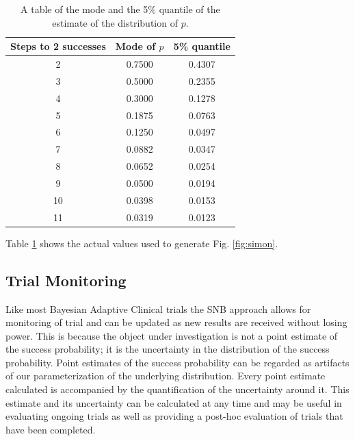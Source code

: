 \documentclass[12pt]{article}         %
\begin{document}
\begin{table}
\begin{center}
\begin{tabular}{|c|c|c|} \hline
{\bf Steps to 2 successes} & {\bf Mode of $p$} & {\bf 5\% quantile} \\ \hline
2 & 0.7500  & 0.4307 \\ \hline
3 & 0.5000  & 0.2355 \\ \hline
4 & 0.3000  & 0.1278 \\ \hline
5 & 0.1875  & 0.0763 \\ \hline
6 & 0.1250  & 0.0497 \\ \hline
7 & 0.0882  & 0.0347 \\ \hline
8 & 0.0652  & 0.0254 \\ \hline
9 & 0.0500  & 0.0194 \\ \hline
10 & 0.0398 & 0.0153 \\ \hline
11 & 0.0319 & 0.0123 \\ \hline
\end{tabular} 
\end{center}
\caption{
A table of the mode and the 5\% quantile of the estimate of the distribution of $p$.
}
\label{tab:simon}
\end{table} 

Table \ref{tab:simon} shows the actual values used to generate Fig. 
\ref{fig:simon}. 

\subsection{Trial Monitoring}

Like most Bayesian Adaptive Clinical trials the SNB approach allows for monitoring of trial and can be updated as new results are received without losing 
power. This is because the object under investigation is not a point estimate 
of the success probability; it is the uncertainty in the distribution of the 
success probability. Point estimates of the success probability can be 
regarded as artifacts of our parameterization of the underlying distribution. 
Every point estimate calculated is accompanied by the quantification of the 
uncertainty around it. This estimate and its uncertainty can be calculated at 
any time and may be useful in evaluating ongoing trials as well as providing a 
post-hoc evaluation of trials that have been completed.
\end{document}
